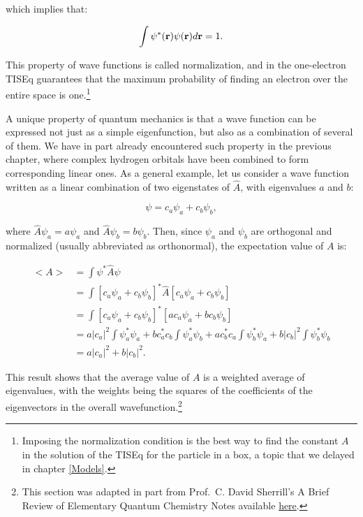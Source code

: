 \documentclass[
  9pt,
]{extbook}
\theoremstyle{definition}
\theoremstyle{definition}
\theoremstyle{definition}
\theoremstyle{remark}
\begin{document}
which implies that:

\begin{equation}
\int \psi^{*}({\bf r}) \psi({\bf r}) d{\bf r} = 1.
\label{eq:ee4}
\end{equation}

This property of wave functions is called normalization, and in the one-electron TISEq guarantees that the maximum probability of finding an electron over the entire space is one.\footnote{Imposing the normalization condition is the best way to find the constant \(A\) in the solution of the TISEq for the particle in a box, a topic that we delayed in chapter \ref{Models}.}

A unique property of quantum mechanics is that a wave function can be expressed not just as a simple eigenfunction, but also as a combination of several of them. We have in part already encountered such property in the previous chapter, where complex hydrogen orbitals have been combined to form corresponding linear ones. As a general example, let us consider a wave function written as a linear combination of two eigenstates of \(\hat{A}\), with eigenvalues \(a\) and \(b\):

\begin{equation}
\psi = c_a \psi_a + c_b \psi_b,
\label{eq:ee5}
\end{equation}

where \(\hat{A} \psi_a = a \psi_a\) and \(\hat{A} \psi_b = b \psi_b\). Then, since \(\psi_a\) and \(\psi_b\) are orthogonal and normalized (usually abbreviated as orthonormal), the expectation value of \(A\) is:

\begin{equation}
\begin{aligned}
<A> &= \int \psi^{*} \hat{A} \psi \\
 	&= \int \left[ c_a \psi_a + c_b \psi_b \right]^{*} \hat{A} \left[ c_a \psi_a + c_b \psi_b \right] \\
 	&= \int \left[ c_a \psi_a + c_b \psi_b \right]^{*}
\left[ a c_a \psi_a + b c_b \psi_b \right] \\	 
 	&= a \vert c_a\vert^2 \int \psi_a^{*} \psi_a +
b c_a^{*} c_b \int \psi_a^{*} \psi_b + a c_b^{*} c_a \int \psi_b^{*} \psi_a +
b \vert c_b\vert^2 \int \psi_b^{*} \psi_b \\ 
 	&= a \vert c_a\vert^2 + b \vert c_b\vert^2.
\end{aligned}
\label{eq:ee6}    
\end{equation}

This result shows that the average value of \(A\) is a weighted average of eigenvalues, with the weights being the squares of the coefficients of the eigenvectors in the overall wavefunction.\footnote{This section was adapted in part from Prof.~C. David Sherrill's A Brief Review of Elementary Quantum Chemistry Notes available \href{http://vergil.chemistry.gatech.edu/notes/quantrev/node1.html}{here}.}
\end{document}
